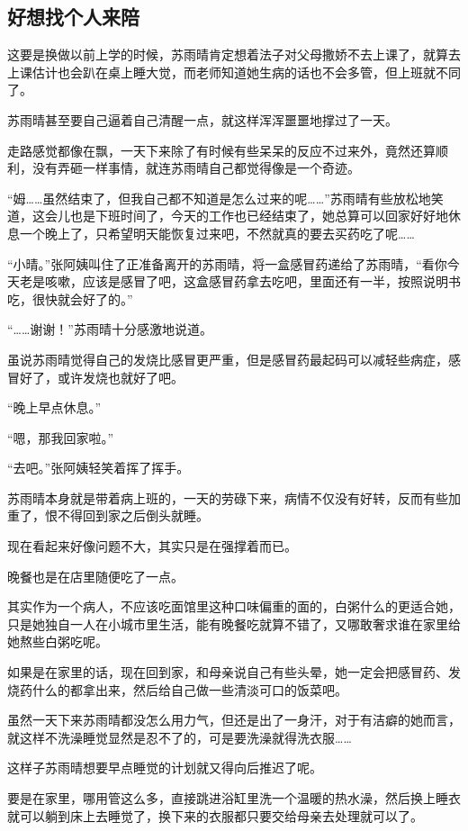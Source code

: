 \subsection{好想找个人来陪}

这要是换做以前上学的时候，苏雨晴肯定想着法子对父母撒娇不去上课了，就算去上课估计也会趴在桌上睡大觉，而老师知道她生病的话也不会多管，但上班就不同了。

苏雨晴甚至要自己逼着自己清醒一点，就这样浑浑噩噩地撑过了一天。

走路感觉都像在飘，一天下来除了有时候有些呆呆的反应不过来外，竟然还算顺利，没有弄砸一样事情，就连苏雨晴自己都觉得像是一个奇迹。

“姆……虽然结束了，但我自己都不知道是怎么过来的呢……”苏雨晴有些放松地笑道，这会儿也是下班时间了，今天的工作也已经结束了，她总算可以回家好好地休息一个晚上了，只希望明天能恢复过来吧，不然就真的要去买药吃了呢……

“小晴。”张阿姨叫住了正准备离开的苏雨晴，将一盒感冒药递给了苏雨晴，“看你今天老是咳嗽，应该是感冒了吧，这盒感冒药拿去吃吧，里面还有一半，按照说明书吃，很快就会好了的。”

“……谢谢！”苏雨晴十分感激地说道。

虽说苏雨晴觉得自己的发烧比感冒更严重，但是感冒药最起码可以减轻些病症，感冒好了，或许发烧也就好了吧。

“晚上早点休息。”

“嗯，那我回家啦。”

“去吧。”张阿姨轻笑着挥了挥手。

苏雨晴本身就是带着病上班的，一天的劳碌下来，病情不仅没有好转，反而有些加重了，恨不得回到家之后倒头就睡。

现在看起来好像问题不大，其实只是在强撑着而已。

晚餐也是在店里随便吃了一点。

其实作为一个病人，不应该吃面馆里这种口味偏重的面的，白粥什么的更适合她，只是她独自一人在小城市里生活，能有晚餐吃就算不错了，又哪敢奢求谁在家里给她熬些白粥吃呢。

如果是在家里的话，现在回到家，和母亲说自己有些头晕，她一定会把感冒药、发烧药什么的都拿出来，然后给自己做一些清淡可口的饭菜吧。

虽然一天下来苏雨晴都没怎么用力气，但还是出了一身汗，对于有洁癖的她而言，就这样不洗澡睡觉显然是忍不了的，可是要洗澡就得洗衣服……

这样子苏雨晴想要早点睡觉的计划就又得向后推迟了呢。

要是在家里，哪用管这么多，直接跳进浴缸里洗一个温暖的热水澡，然后换上睡衣就可以躺到床上去睡觉了，换下来的衣服都只要交给母亲去处理就可以了。


